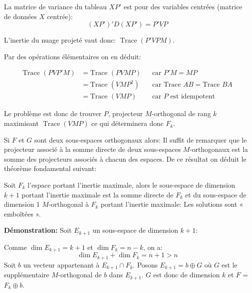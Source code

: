 \documentclass[12pt,a4paper]{article}
\begin{document}
La matrice de variance du tableau $XP'$ est pour des variables centrées (matrice de données $X$ centrée):
\[(XP')'D(XP') = P'V P\]

L'inertie du nuage projeté vaut donc: $\operatorname{Trace}(P'V P M)$.

Par des opérations élémentaires on en déduit:

\[
\begin{aligned}
\text{Trace }(PVP'M) &= \text{Trace }(PVMP) 
&& \text{car } P'M = MP \\
&= \text{Trace }(VMP^2) 
&& \text{car Trace } AB = \text{Trace } BA \\
&= \text{Trace }(VMP) 
&& \text{car } P \text{ est idempotent}
\end{aligned}
\]

\vspace{0.8\baselineskip}

Le problème est donc de trouver $P$, projecteur $M$-orthogonal de rang $k$ maximisant
$\operatorname{Trace}(V M P)$ ce qui déterminera donc $F_k$.

\vspace{0.8\baselineskip}

\newpage
Si $F$ et $G$ sont deux sous-espaces orthogonaux alors:
\newline
Il suffit de remarquer que le projecteur associé à la somme directe de deux sous-espaces
$M$-orthogonaux est la somme des projecteurs associés à chacun des espaces.
\newline
De ce résultat on déduit le théorème fondamental suivant:

\vspace{0.8\baselineskip}



\begin{theoreme}
Soit $F_k$ l'espace portant l'inertie maximale, alors le sous-espace de dimension
$k + 1$ portant l'inertie maximale est la somme directe de $F_k$ et du sous-espace
de dimension 1 $M$-orthogonal à $F_k$ portant l'inertie maximale: Les solutions sont
« emboîtées ».
\end{theoreme}

\textbf{Démonstration:} Soit $E_{k+1}$ un sous-espace de dimension $k + 1$:
\newline 

Comme $\dim E_{k+1} = k + 1$ et $\dim F_k = n - k$, on a:
\[\dim E_{k+1} + \dim F_k = n + 1 > n\]
\newline
Soit $b$ un vecteur appartenant à $E_{k+1} \cap F_k$. \newline
Posons $E_{k+1} = b \oplus G$ où $G$ est le supplémentaire $M$-orthogonal de $b$ dans $E_{k+1}$. \newline
$G$ est donc de dimension $k$ et $F$ = $F_k \oplus b$.
\end{document}
